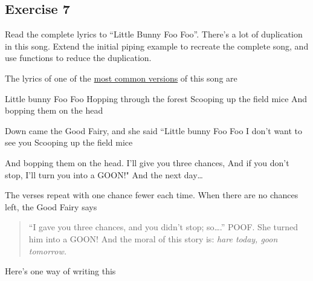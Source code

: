 \documentclass[]{book}
\theoremstyle{plain}
\theoremstyle{remark}
\theoremstyle{definition}
\theoremstyle{definition}
\theoremstyle{definition}
\theoremstyle{remark}
\begin{document}
\hypertarget{exercise-7-4}{%
\subsection{Exercise 7}\label{exercise-7-4}}

Read the complete lyrics to ``Little Bunny Foo Foo''. There's a lot of
duplication in this song. Extend the initial piping example to recreate
the complete song, and use functions to reduce the duplication.

The lyrics of one of the
\href{https://en.wikipedia.org/wiki/Little_Bunny_Foo_Foo}{most common
versions} of this song are

Little bunny Foo Foo Hopping through the forest Scooping up the field
mice And bopping them on the head

Down came the Good Fairy, and she said ``Little bunny Foo Foo I don't
want to see you Scooping up the field mice

And bopping them on the head. I'll give you three chances, And if you
don't stop, I'll turn you into a GOON!" And the next day\ldots{}

The verses repeat with one chance fewer each time. When there are no
chances left, the Good Fairy says

\begin{quote}
``I gave you three chances, and you didn't stop; so\ldots{}.'' POOF. She
turned him into a GOON! And the moral of this story is: \emph{hare
today, goon tomorrow.}
\end{quote}

Here's one way of writing this
\end{document}
